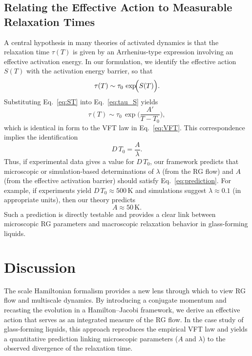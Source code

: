 \documentclass[12pt]{article}
\begin{document}
\subsection{Relating the Effective Action to Measurable Relaxation Times}
A central hypothesis in many theories of activated dynamics is that the relaxation time \(\tau(T)\) is given by an Arrhenius-type expression involving an effective activation energy. In our formulation, we identify the effective action \(S(T)\) with the activation energy barrier, so that
\begin{equation} \label{eq:tau_S}
\tau(T) \sim \tau_0\, \exp\!\Bigl(S(T)\Bigr).
\end{equation}
Substituting Eq.~\eqref{eq:ST} into Eq.~\eqref{eq:tau_S} yields
\begin{equation} \label{eq:tau_VFT}
\tau(T) \sim \tau_0\, \exp\!\Biggl(\frac{A'}{T-T_0}\Biggr),
\end{equation}
which is identical in form to the VFT law in Eq.~\eqref{eq:VFT}. This correspondence implies the identification
\begin{equation} \label{eq:prediction}
D\,T_0 = \frac{A}{\lambda}.
\end{equation}
Thus, if experimental data gives a value for \(D\,T_0\), our framework predicts that microscopic or simulation-based determinations of \(\lambda\) (from the RG flow) and \(A\) (from the effective activation barrier) should satisfy Eq.~\eqref{eq:prediction}. For example, if experiments yield \(D\,T_0 \approx 500\,\text{K}\) and simulations suggest \(\lambda \approx 0.1\) (in appropriate units), then our theory predicts
\[
A \approx 50\,\text{K}.
\]
Such a prediction is directly testable and provides a clear link between microscopic RG parameters and macroscopic relaxation behavior in glass-forming liquids.

\section{Discussion} \label{sec:discussion}
The scale Hamiltonian formalism provides a new lens through which to view RG flow and multiscale dynamics. By introducing a conjugate momentum and recasting the evolution in a Hamilton--Jacobi framework, we derive an effective action that serves as an integrated measure of the RG flow. In the case study of glass-forming liquids, this approach reproduces the empirical VFT law and yields a quantitative prediction linking microscopic parameters (\(A\) and \(\lambda\)) to the observed divergence of the relaxation time.
\end{document}
